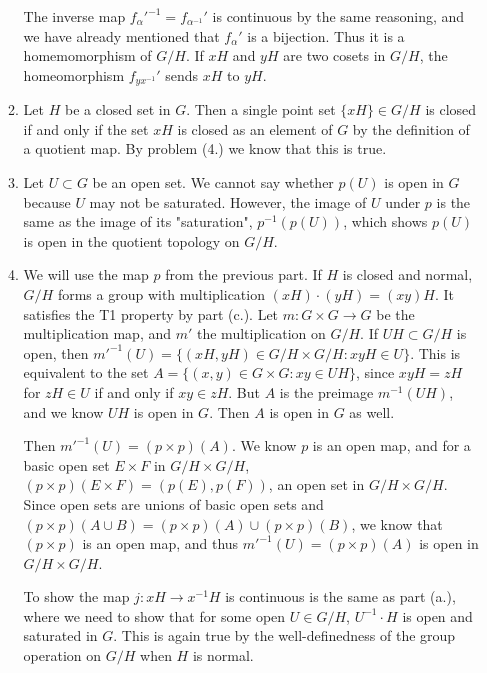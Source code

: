\documentclass[11pt, reqno]{article}
\theoremstyle{plain}
\theoremstyle{definition}
\theoremstyle{remark}
\begin{document}
\begin{enumerate}
\begin{enumerate}
        The inverse map $f_\alpha'^{-1} = f_{\alpha^{-1}}'$ is continuous by the same reasoning, and we have already mentioned that 
        $f_\alpha'$ is a bijection. Thus it is a homemomorphism of $G/H$. If $xH$ and $yH$ are two cosets in $G/H$,
        the homeomorphism $f_{yx^{-1}}'$ sends $xH$ to $yH$.
    
        \item Let $H$ be a closed set in $G$. Then a single point set $\{xH\} \in G/H$ is closed if and only if the 
        set $xH$ is closed as an element of $G$ by the definition of a quotient map. By problem (4.) we know that this is true.
        
        \item Let $U \subset G$ be an open set. We cannot say whether $p(U)$ is open in $G$ because $U$ may not be saturated. 
        However, the image of $U$ under $p$ is the same as the image of its "saturation", $p^{-1}(p(U))$, which shows 
        $p(U)$ is open
        in the quotient topology on $G/H$.

        \item We will use the map $p$ from the previous part. If $H$ is closed and normal, $G/H$ forms a group with 
        multiplication $(xH)\cdot(yH) = (xy)H$. It satisfies the T1 property by part (c.). Let $m: G \times G \rightarrow G$
        be the multiplication map, and $m'$ the multiplication on $G/H$.
        \bigbreak
        If $UH \subset G/H$ is open, then $m'^{-1}(U) = \{(xH,yH) \in G/H \times G/H: xyH \in U\}$.
        This is equivalent to the set $A = \{(x,y) \in G \times G: xy \in UH\}$, since $xyH = zH$ for $zH \in U$ if and only if 
        $xy \in zH$. But $A$ is the preimage $m^{-1}(UH)$, and we know $UH$ is open in $G$. Then $A$ is open in $G$ as well.
        
        Then $m'^{-1}(U) = (p \times p)(A)$. We know $p$ is an open map, and for a basic open set $E\times F$ in $G/H \times G/H$,
        $(p \times p)(E \times F) = (p(E),p(F))$, an open set in $G/H \times G/H$. Since open sets are unions of basic open 
        sets and $(p \times p)(A \cup B) = (p\times p)(A) \cup (p \times p)(B)$, we know that $(p \times p)$ is an open 
        map, and thus $m'^{-1}(U) = (p \times p)(A)$ is open in $G/H \times G/H$. 

        To show the map $j: xH \rightarrow x^{-1}H$ is continuous is the same as part (a.), where 
        we need to show that for some open $U \in G/H$, $U^{-1}\cdot H$ is open and saturated in $G$. This is again true
        by the well-definedness of the group operation on $G/H$ when $H$ is normal. 
    \end{enumerate}
\end{enumerate}
\end{document}

